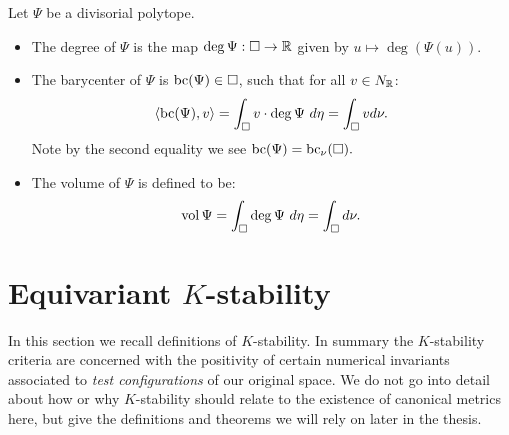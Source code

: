 \begin{definition}
Let \(\Psi\) be a divisorial polytope.
\begin{itemize}
\item The degree of \(\Psi\) is the map \( \deg \Psi : \Box \to \mathbb{R}\) given by \( u \mapsto \deg (\Psi(u))\).
\item The barycenter of \(\Psi\) is \(\mathop{\rm bc}\nolimits(\Psi) \in \Box\), such that for all \(v \in N_{\mathbb{R}}\):
\[
\langle \mathop{\rm bc}\nolimits(\Psi), v \rangle = \int_\Box v \cdot \deg \Psi \ d \eta = \int_\Box v d \nu. 
\]
Note by the second equality we see \(\mathop{\rm bc}\nolimits(\Psi) = \mathop{\rm bc}\nolimits_\nu(\Box).\)
\item The volume of \(\Psi\) is defined to be:
\[
\mathop{\rm vol}\nolimits \Psi = \int_\Box \deg \Psi \ d \eta = \int_\Box d \nu.
\]
\end{itemize}
\end{definition}
\section{Equivariant $K$-stability} \label{sec:eqKstab}
In this section we recall definitions of \(K\)-stability. In summary the \(K\)-stability criteria are concerned with the positivity of certain numerical invariants associated to \textit{test configurations} of our original space. We do not go into detail about how or why \(K\)-stability should relate to the existence of canonical metrics here, but give the definitions and theorems we will rely on later in the thesis.
